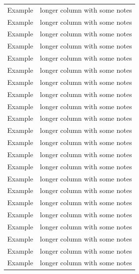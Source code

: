 \begin{landscape}
\begin{longtable}{c|p{12cm}}
		Example & longer column with some notes \\
		Example & longer column with some notes \\
		Example & longer column with some notes \\
		Example & longer column with some notes \\
		Example & longer column with some notes \\
		Example & longer column with some notes \\
		Example & longer column with some notes \\
		Example & longer column with some notes \\
		Example & longer column with some notes \\
		Example & longer column with some notes \\
		Example & longer column with some notes \\
		Example & longer column with some notes \\
		Example & longer column with some notes \\
		Example & longer column with some notes \\
		Example & longer column with some notes \\
		Example & longer column with some notes \\
		Example & longer column with some notes \\
		Example & longer column with some notes \\
		Example & longer column with some notes \\
		Example & longer column with some notes \\
		Example & longer column with some notes \\
		Example & longer column with some notes \\
	\end{longtable}
\end{landscape}
